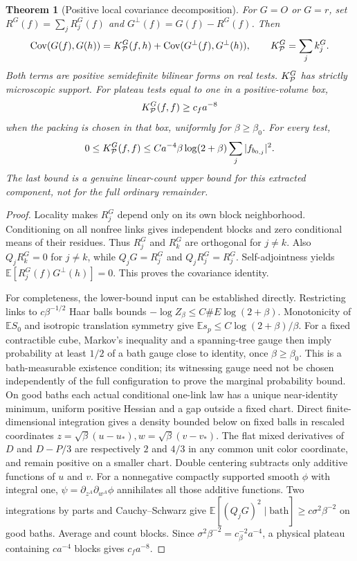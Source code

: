 \documentclass[11pt]{article}
\newtheorem{theorem}{Theorem}
\newcommand{\E}{\mathbb E}
\newcommand{\Cov}{\operatorname{Cov}}
\begin{document}
\begin{theorem}[Positive local covariance decomposition]
For $G=O$ or $G=r$, set $R^G(f)=\sum_jR_j^G(f)$ and $G^\perp(f)=G(f)-R^G(f)$.
Then
\[
 \Cov(G(f),G(h))=K_{\cal P}^G(f,h)+\Cov(G^\perp(f),G^\perp(h)),\qquad
 K_{\cal P}^G=\sum_j k_j^G.
\]
Both terms are positive semidefinite bilinear forms on real tests. $K_{\cal P}^G$ has
strictly microscopic support. For plateau tests equal to one in a positive-volume box,
\[
 K_{\cal P}^G(f,f)\ge c_f a^{-8}
\]
when the packing is chosen in that box, uniformly for $\beta\ge\beta_0$.
For every test,
\[
 0\le K_{\cal P}^G(f,f)\le
 C a^{-4}\beta\log(2+\beta)\sum_j |f_{b_{0,j}}|^2.
\]
The last bound is a genuine linear-count upper bound for this extracted component,
not for the full ordinary remainder.
\end{theorem}
\begin{proof}
Locality makes $R_j^G$ depend only on its own block neighborhood. Conditioning on all
nonfree links gives independent blocks and zero conditional means of their residues.
Thus $R_j^G$ and $R_k^G$ are orthogonal for $j\ne k$.
Also $Q_jR_k^G=0$ for $j\ne k$, while $Q_jG=R_j^G$ and $Q_jR_j^G=R_j^G$.
Self-adjointness yields $\E[R_j^G(f)G^\perp(h)]=0$. This proves the covariance identity.

For completeness, the lower-bound input can be established directly. Restricting links
to $c\beta^{-1/2}$ Haar balls bounds $-\log Z_\beta\le C\#E\log(2+\beta)$.
Monotonicity of $\E S_0$ and isotropic translation symmetry give
$\E s_p\le C\log(2+\beta)/\beta$.
For a fixed contractible cube, Markov's inequality and a spanning-tree gauge then imply
probability at least $1/2$ of a bath gauge close to identity, once $\beta\ge\beta_0$.
This is a bath-measurable existence condition; its witnessing gauge need not be chosen
independently of the full configuration to prove the marginal probability bound.
On good baths each actual conditional one-link law has a unique near-identity minimum,
uniform positive Hessian and a gap outside a fixed chart. Direct finite-dimensional
integration gives a density bounded below on fixed balls in rescaled coordinates
$z=\sqrt\beta(u-u_*),w=\sqrt\beta(v-v_*)$.
The flat mixed derivatives of $D$ and $D-P/3$ are respectively $2$ and $4/3$
in any common unit color coordinate, and remain positive on a smaller chart.
Double centering subtracts only additive functions of $u$ and $v$.
For a nonnegative compactly supported smooth $\phi$ with integral one,
$\psi=\partial_{z^A}\partial_{w^A}\phi$ annihilates all those additive functions.
Two integrations by parts and Cauchy--Schwarz give
$\E[(Q_jG)^2\mid\text{bath}]\ge c\sigma^2\beta^{-2}$ on good baths.
Average and count blocks. Since $\sigma^2\beta^{-2}=c_\beta^{-2}a^{-4}$,
a physical plateau containing $c a^{-4}$ blocks gives $c_fa^{-8}$.


\end{proof}
\end{document}
